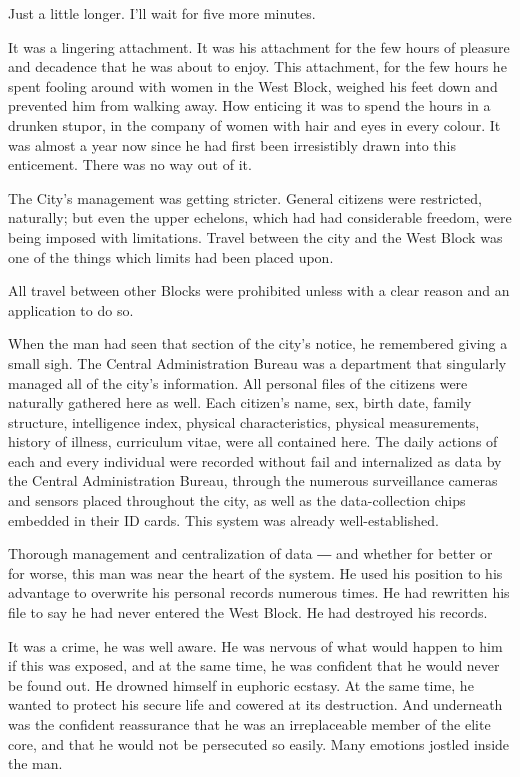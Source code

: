 Just a little longer. I'll wait for five more minutes.

It was a lingering attachment. It was his attachment for the few hours
of pleasure and decadence that he was about to enjoy. This attachment,
for the few hours he spent fooling around with women in the West Block,
weighed his feet down and prevented him from walking away. How enticing
it was to spend the hours in a drunken stupor, in the company of women
with hair and eyes in every colour. It was almost a year now since he
had first been irresistibly drawn into this enticement. There was no way
out of it.

The City's management was getting stricter. General citizens were
restricted, naturally; but even the upper echelons, which had had
considerable freedom, were being imposed with limitations. Travel
between the city and the West Block was one of the things which limits
had been placed upon.

All travel between other Blocks were prohibited unless with a clear
reason and an application to do so.

When the man had seen that section of the city's notice, he remembered
giving a small sigh. The Central Administration Bureau was a department
that singularly managed all of the city's information. All personal
files of the citizens were naturally gathered here as well. Each
citizen's name, sex, birth date, family structure, intelligence index,
physical characteristics, physical measurements, history of illness,
curriculum vitae, were all contained here. The daily actions of each and
every individual were recorded without fail and internalized as data by
the Central Administration Bureau, through the numerous surveillance
cameras and sensors placed throughout the city, as well as the
data-collection chips embedded in their ID cards. This system was
already well-established.

Thorough management and centralization of data ― and whether for better
or for worse, this man was near the heart of the system. He used his
position to his advantage to overwrite his personal records numerous
times. He had rewritten his file to say he had never entered the West
Block. He had destroyed his records.

It was a crime, he was well aware. He was nervous of what would happen
to him if this was exposed, and at the same time, he was confident that
he would never be found out. He drowned himself in euphoric ecstasy. At
the same time, he wanted to protect his secure life and cowered at its
destruction. And underneath was the confident reassurance that he was an
irreplaceable member of the elite core, and that he would not be
persecuted so easily. Many emotions jostled inside the man.

